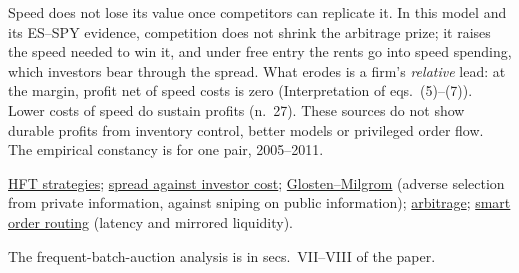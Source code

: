 \begin{qfresult}
 Speed does not lose its value once competitors can replicate it. In this model and its ES--SPY evidence, competition does not shrink the arbitrage prize; it raises the speed needed to win it, and under free entry the rents go into speed spending, which investors bear through the spread. What erodes is a firm's \emph{relative} lead: at the margin, profit net of speed costs is zero (Interpretation of eqs.~(5)--(7)). Lower costs of speed do sustain profits (n.~27). These sources do not show durable profits from inventory control, better models or privileged order flow. The empirical constancy is for one pair, 2005--2011.

 \hyperref[def:hft-strategies]{HFT strategies}; \hyperref[res:hft-spread-investor-cost]{spread against investor cost}; \hyperref[mod:glosten-milgrom]{Glosten--Milgrom} (adverse selection from private information, against sniping on public information); \hyperref[def:arbitrage]{arbitrage}; \hyperref[def:smart-order-routing]{smart order routing} (latency and mirrored liquidity).

 The frequent-batch-auction analysis is in secs.~VII--VIII of the paper.

\end{qfresult}

